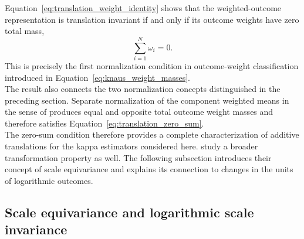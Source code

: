 \documentclass[12pt, a4paper, oneside]{article}
\theoremstyle{plain}
\theoremstyle{definition}
\begin{document}
Equation~\eqref{eq:translation_weight_identity} shows that the weighted-outcome
representation is translation invariant if and only if its outcome weights have
zero total mass,
\begin{equation}
    \sum_{i=1}^{N}\omega_i=0.
    \label{eq:translation_zero_sum}
\end{equation}
This is precisely the first normalization condition in \citet{knaus2024treatment} outcome-weight
classification introduced in
Equation~\eqref{eq:knaus_weight_masses}. \\
The result also connects the two normalization concepts distinguished in the
preceding section. Separate normalization of the component weighted means in the
sense of \citet{sloczynski2025abadie} produces equal and opposite total outcome
weight masses and therefore satisfies
Equation~\eqref{eq:translation_zero_sum}.\\
The zero-sum condition therefore provides a complete characterization of additive
translations for the kappa estimators considered here. \citet{sloczynski2025abadie} study a broader transformation property as well. The following
subsection introduces their concept of scale equivariance and explains its
connection to changes in the units of logarithmic outcomes.


\subsection{Scale equivariance and logarithmic scale invariance}
\label{subsec:scale_equivariance}
\end{document}
